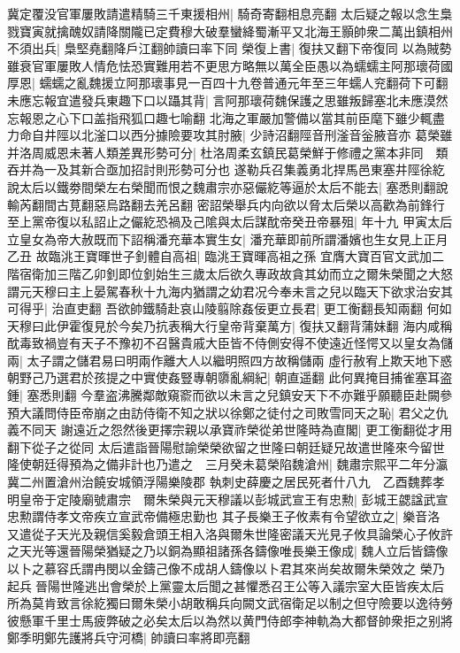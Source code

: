 冀定覆没官軍屢敗請遣精騎三千東援相州|{
	騎奇寄翻相息亮翻}
太后疑之報以念生梟戮寶寅就擒醜奴請降關隴已定費穆大破羣蠻絳蜀漸平又北海王顥帥衆二萬出鎮相州不須出兵|{
	梟堅堯翻降戶江翻帥讀曰率下同}
榮復上書|{
	復扶又翻下帝復同}
以為賊勢雖衰官軍屢敗人情危怯恐實難用若不更思方略無以萬全臣愚以為蠕蠕主阿那瓌荷國厚恩|{
	蠕蠕之亂魏援立阿那瓌事見一百四十九卷普通元年至三年蠕人兖翻荷下可翻}
未應忘報宜遣發兵東趣下口以躡其背|{
	言阿那瓌荷魏保護之思雖叛歸塞北未應漠然忘報恩之心下口盖指飛狐口趣七喻翻}
北海之軍嚴加警備以當其前臣麾下雖少輒盡力命自井陘以北滏口以西分據險要攻其肘腋|{
	少詩沼翻陘音刑滏音釡腋音亦}
葛榮雖并洛周威恩未著人類差異形勢可分|{
	杜洛周柔玄鎮民葛榮鮮于修禮之黨本非同　類吞并為一及其新合亟加招討則形勢可分也}
遂勒兵召集義勇北捍馬邑東塞井陘徐紇說太后以鐵劵間榮左右榮聞而恨之魏肅宗亦惡儼紇等逼於太后不能去|{
	塞悉則翻說輸芮翻間古莧翻惡烏路翻去羌呂翻}
密詔榮舉兵内向欲以脅太后榮以高歡為前鋒行至上黨帝復以私詔止之儼紇恐禍及己隂與太后謀酖帝癸丑帝暴殂|{
	年十九}
甲寅太后立皇女為帝大赦既而下詔稱潘充華本實生女|{
	潘充華即前所謂潘嬪也生女見上正月乙丑}
故臨洮王寶暉世子釗體自高祖|{
	臨洮王寶暉高祖之孫}
宜膺大寶百官文武加二階宿衛加三階乙卯釗即位釗始生三歲太后欲久專政故貪其幼而立之爾朱榮聞之大怒謂元天穆曰主上晏駕春秋十九海内猶謂之幼君况今奉未言之兒以臨天下欲求治安其可得乎|{
	治直吏翻}
吾欲帥鐵騎赴哀山陵翦除姦佞更立長君|{
	更工衡翻長知兩翻}
何如天穆曰此伊霍復見於今矣乃抗表稱大行皇帝背棄萬方|{
	復扶又翻背蒲妹翻}
海内咸稱酖毒致禍豈有天子不豫初不召醫貴戚大臣皆不侍側安得不使遠近怪愕又以皇女為儲兩|{
	太子謂之儲君易曰明兩作離大人以繼明照四方故稱儲兩}
虛行赦宥上欺天地下惑朝野己乃選君於孩提之中實使姦豎專朝隳亂綱紀|{
	朝直遥翻}
此何異掩目捕雀塞耳盗鍾|{
	塞悉則翻}
今羣盗沸騰鄰敵窺窬而欲以未言之兒鎮安天下不亦難乎願聽臣赴闕參預大議問侍臣帝崩之由訪侍衛不知之狀以徐鄭之徒付之司敗雪同天之恥|{
	君父之仇義不同天}
謝遠近之怨然後更擇宗親以承寶祚榮從弟世隆時為直閣|{
	更工衡翻從才用翻下從子之從同}
太后遣詣晉陽慰諭榮榮欲留之世隆曰朝廷疑兄故遣世隆來今留世隆使朝廷得預為之備非計也乃遣之　三月癸未葛榮陷魏滄州|{
	魏肅宗熙平二年分瀛冀二州置滄州治饒安城領浮陽樂陵郡}
執刺史薛慶之居民死者什八九　乙酉魏葬孝明皇帝于定陵廟號肅宗　爾朱榮與元天穆議以彭城武宣王有忠勲|{
	彭城王勰諡武宣忠勲謂侍孝文帝疾立宣武帝備極忠勤也}
其子長樂王子攸素有令望欲立之|{
	樂音洛}
又遣從子天光及親信奚毅倉頭王相入洛與爾朱世隆密議天光見子攸具論榮心子攸許之天光等還晉陽榮猶疑之乃以銅為顯祖諸孫各鑄像唯長樂王像成|{
	魏人立后皆鑄像以卜之慕容氏謂冉閔以金鑄己像不成胡人鑄像以卜君其來尚矣故爾朱榮效之}
榮乃起兵晉陽世隆逃出會榮於上黨靈太后聞之甚懼悉召王公等入議宗室大臣皆疾太后所為莫肯致言徐紇獨曰爾朱榮小胡敢稱兵向闕文武宿衛足以制之但守險要以逸待勞彼懸軍千里士馬疲弊破之必矣太后以為然以黄門侍郎李神軌為大都督帥衆拒之别將鄭季明鄭先護將兵守河橋|{
	帥讀曰率將即亮翻}
